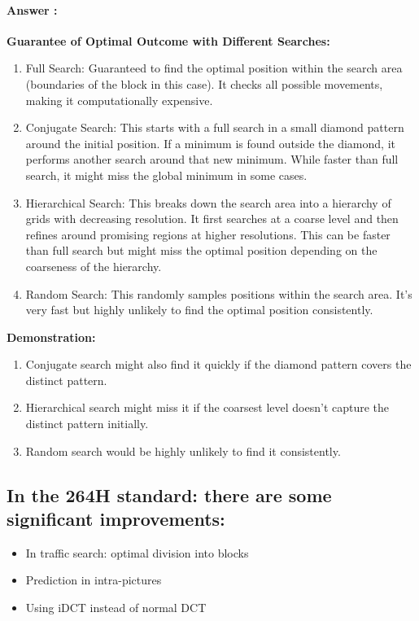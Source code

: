 \documentclass[letterpaper, 12pt]{article}
\begin{document}
\paragraph{Answer :} \textbf{Guarantee of Optimal Outcome with Different Searches:} \\
\begin{enumerate}
    \item Full Search: Guaranteed to find the optimal position within the search area (boundaries of the block in this case). It checks all possible movements, making it computationally expensive.
    \item Conjugate Search: This starts with a full search in a small diamond pattern around the initial position. If a minimum is found outside the diamond, it performs another search around that new minimum. While faster than full search, it might miss the global minimum in some cases.
    \item Hierarchical Search: This breaks down the search area into a hierarchy of grids with decreasing resolution. It first searches at a coarse level and then refines around promising regions at higher resolutions. This can be faster than full search but might miss the optimal position depending on the coarseness of the hierarchy.
    \item Random Search: This randomly samples positions within the search area. It's very fast but highly unlikely to find the optimal position consistently.
\end{enumerate}

\textbf{Demonstration}\textbf{:} \\
\begin{enumerate}
    \item Conjugate search might also find it quickly if the diamond pattern covers the distinct pattern.
    \item Hierarchical search might miss it if the coarsest level doesn't capture the distinct pattern initially.
    \item Random search would be highly unlikely to find it consistently.
\end{enumerate}


\subsection{In the 264H standard: there are some significant improvements:}
\begin{itemize}
    \item In traffic search: optimal division into blocks
    \item Prediction in intra-pictures
    \item Using iDCT instead of normal DCT
\end{itemize}
\end{document}
